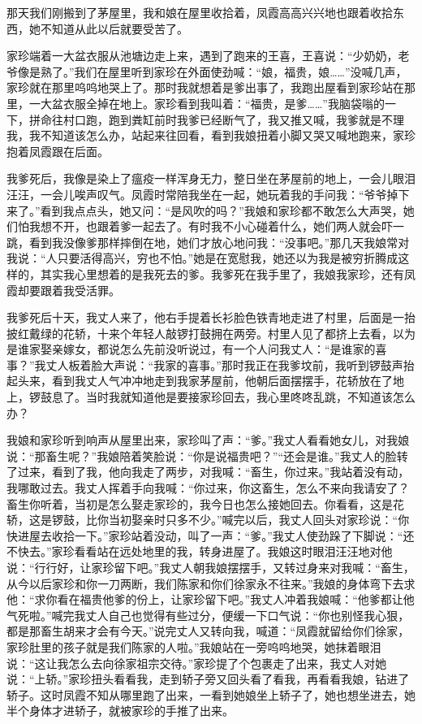 \documentclass[12pt,UTF8]{ctexbook}
\begin{document}
那天我们刚搬到了茅屋里，我和娘在屋里收拾着，凤霞高高兴兴地也跟着收拾东西，她不知道从此以后就要受苦了。

家珍端着一大盆衣服从池塘边走上来，遇到了跑来的王喜，王喜说：“少奶奶，老爷像是熟了。”我们在屋里听到家珍在外面使劲喊：“娘，福贵，娘……”没喊几声，家珍就在那里呜呜地哭上了。那时我就想着是爹出事了，我跑出屋看到家珍站在那里，一大盆衣服全掉在地上。家珍看到我叫着：“福贵，是爹……”我脑袋嗡的一下，拼命往村口跑，跑到粪缸前时我爹已经断气了，我又推又喊，我爹就是不理我，我不知道该怎么办，站起来往回看，看到我娘扭着小脚又哭又喊地跑来，家珍抱着凤霞跟在后面。

我爹死后，我像是染上了瘟疫一样浑身无力，整日坐在茅屋前的地上，一会儿眼泪汪汪，一会儿唉声叹气。凤霞时常陪我坐在一起，她玩着我的手问我：“爷爷掉下来了。”看到我点点头，她又问：“是风吹的吗？”我娘和家珍都不敢怎么大声哭，她们怕我想不开，也跟着爹一起去了。有时我不小心碰着什么，她们两人就会吓一跳，看到我没像爹那样摔倒在地，她们才放心地问我：“没事吧。”那几天我娘常对我说：“人只要活得高兴，穷也不怕。”她是在宽慰我，她还以为我是被穷折腾成这样的，其实我心里想着的是我死去的爹。我爹死在我手里了，我娘我家珍，还有凤霞却要跟着我受活罪。

我爹死后十天，我丈人来了，他右手提着长衫脸色铁青地走进了村里，后面是一抬披红戴绿的花轿，十来个年轻人敲锣打鼓拥在两旁。村里人见了都挤上去看，以为是谁家娶亲嫁女，都说怎么先前没听说过，有一个人问我丈人：“是谁家的喜事？”我丈人板着脸大声说：“我家的喜事。”那时我正在我爹坟前，我听到锣鼓声抬起头来，看到我丈人气冲冲地走到我家茅屋前，他朝后面摆摆手，花轿放在了地上，锣鼓息了。当时我就知道他是要接家珍回去，我心里咚咚乱跳，不知道该怎么办？

我娘和家珍听到响声从屋里出来，家珍叫了声：“爹。”我丈人看看她女儿，对我娘说：“那畜生呢？”我娘陪着笑脸说：“你是说福贵吧？”“还会是谁。”我丈人的脸转了过来，看到了我，他向我走了两步，对我喊：“畜生，你过来。”我站着没有动，我哪敢过去。我丈人挥着手向我喊：“你过来，你这畜生，怎么不来向我请安了？畜生你听着，当初是怎么娶走家珍的，我今日也怎么接她回去。你看看，这是花轿，这是锣鼓，比你当初娶亲时只多不少。”喊完以后，我丈人回头对家珍说：“你快进屋去收拾一下。”家珍站着没动，叫了一声：“爹。”我丈人使劲跺了下脚说：“还不快去。”家珍看看站在远处地里的我，转身进屋了。我娘这时眼泪汪汪地对他说：“行行好，让家珍留下吧。”我丈人朝我娘摆摆手，又转过身来对我喊：“畜生，从今以后家珍和你一刀两断，我们陈家和你们徐家永不往来。”我娘的身体弯下去求他：“求你看在福贵他爹的份上，让家珍留下吧。”我丈人冲着我娘喊：“他爹都让他气死啦。”喊完我丈人自己也觉得有些过分，便缓一下口气说：“你也别怪我心狠，都是那畜生胡来才会有今天。”说完丈人又转向我，喊道：“凤霞就留给你们徐家，家珍肚里的孩子就是我们陈家的人啦。”我娘站在一旁呜呜地哭，她抹着眼泪说：“这让我怎么去向徐家祖宗交待。”家珍提了个包裹走了出来，我丈人对她说：“上轿。”家珍扭头看看我，走到轿子旁又回头看了看我，再看看我娘，钻进了轿子。这时凤霞不知从哪里跑了出来，一看到她娘坐上轿子了，她也想坐进去，她半个身体才进轿子，就被家珍的手推了出来。
\end{document}
